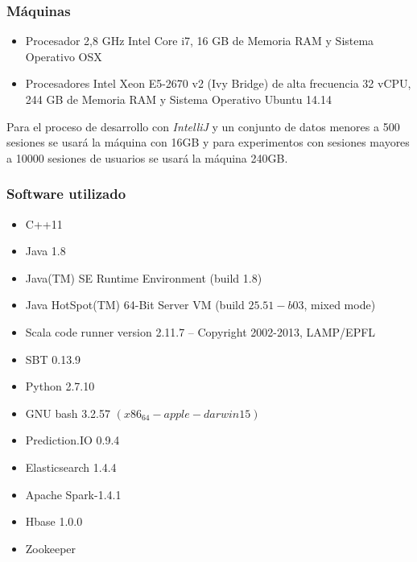 \subsubsection{Máquinas}
	\begin{itemize}
		\setlength{\itemsep}{1pt}
		\setlength{\parskip}{0pt}
		\setlength{\parsep}{0pt}
		\item Procesador 2,8 GHz Intel Core i7, 16 GB de Memoria RAM y Sistema Operativo OSX
		\item Procesadores Intel Xeon E5-2670 v2 (Ivy Bridge) de alta frecuencia 32 vCPU, 244 GB de Memoria RAM y Sistema Operativo Ubuntu 14.14 
	\end{itemize}
	
Para el proceso de desarrollo con \emph{IntelliJ} y un conjunto de datos menores a 500 sesiones se usará la máquina con 16GB y para experimentos con sesiones mayores a 10000 sesiones de usuarios se usará la máquina 240GB.	
	

\subsubsection{Software utilizado}

	\begin{itemize}
		\setlength{\itemsep}{1pt}
		\setlength{\parskip}{0pt}
		\setlength{\parsep}{0pt}
		\item C++11
		\item Java  1.8
		\item Java(TM) SE Runtime Environment (build 1.8)
		\item Java HotSpot(TM) 64-Bit Server VM (build $25.51-b03$, mixed mode)
		\item Scala code runner version 2.11.7 -- Copyright 2002-2013, LAMP/EPFL
		\item SBT 0.13.9 
		\item Python 2.7.10
		\item GNU bash 3.2.57 $(x86_64-apple-darwin15)$
		\item Prediction.IO 0.9.4
		\item Elasticsearch 1.4.4	
		\item Apache Spark-1.4.1
		\item Hbase 1.0.0
		\item Zookeeper 
	\end{itemize}







